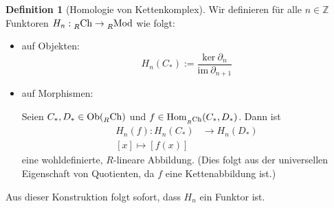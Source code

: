 \documentclass[a4paper,twoside,10pt]{scrreprt}
\newcommand{\Z}{\mathbb{Z}}
\theoremstyle{definition}
\newtheorem{definition}[satz]{Definition}
\begin{document}
\begin{definition}[Homologie von Kettenkomplex]
Wir definieren für alle $n\in \Z$ Funktoren $H_n:\prescript{}{R}{\text{Ch}}\to \prescript{}{R}{\text{Mod}}$ wie folgt:
\begin{itemize}
\item auf Objekten:
\begin{equation*}
H_n(C_*):=\frac{\text{ker}~\partial_n}{\text{im}~\partial_{n+1}}
\end{equation*}
\item auf Morphismen:\par
Seien $C_*,D_*\in \text{Ob}(\prescript{}{R}{\text{Ch}})$ und $f\in \text{Hom}_{\prescript{}{R}{\text{Ch}}}(C_*,D_*)$. Dann ist 
\begin{align*}
H_n(f):H_n(C_*)&\to H_n(D_*)\\
[x]\mapsto [f(x)]
\end{align*}
eine wohldefinierte, $R$-lineare Abbildung. (Dies folgt aus der universellen Eigenschaft von Quotienten, da $f$ eine Kettenabbildung ist.)
\end{itemize}
Aus dieser Konstruktion folgt sofort, dass $H_n$ ein Funktor ist.
\end{definition}
\end{document}
